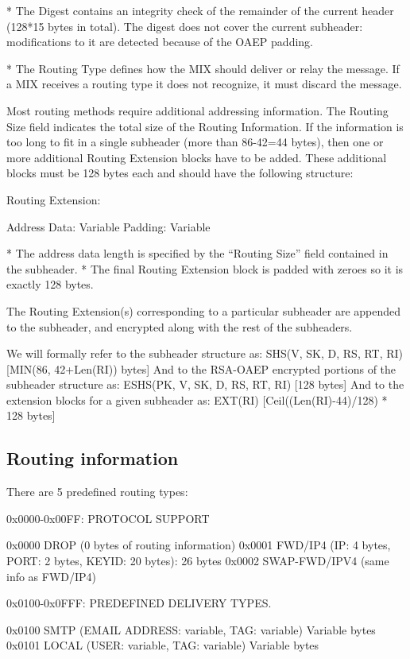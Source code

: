 * The Digest contains an integrity check of the remainder of the current
header (128*15 bytes in total). The digest does not cover the current
subheader: modifications to it are detected because of the OAEP padding.

* The Routing Type defines how the MIX should deliver or relay the
  message. If a MIX receives a routing type it does not recognize,
  it must discard the message.

  Most routing methods require additional addressing information.
  The Routing Size field indicates the total size of the Routing
  Information. If the information is too long to fit in a single
  subheader (more than 86-42=44 bytes), then one or more additional
  Routing Extension blocks have to be added. These additional blocks
  must be 128 bytes each and should have the following structure:
 
  Routing Extension:

    Address Data:     Variable
    Padding:          Variable

* The address data length is specified by the ``Routing Size'' field
  contained in the subheader.
* The final Routing Extension block is padded with zeroes so it is
  exactly 128 bytes.

The Routing Extension(s) corresponding to a particular subheader are
appended to the subheader, and encrypted along with the rest of the
subheaders.

We will formally refer to the subheader structure as:
SHS(V, SK, D, RS, RT, RI)     [MIN(86, 42+Len(RI)) bytes] 
And to the RSA-OAEP encrypted portions of the subheader structure as:
ESHS(PK, V, SK, D, RS, RT, RI)   [128 bytes]
And to the extension blocks for a given subheader as:
EXT(RI)                       [Ceil((Len(RI)-44)/128) * 128 bytes]

\subsection{Routing information}

There are 5 predefined routing types:

0x0000-0x00FF: PROTOCOL SUPPORT

0x0000 DROP    (0 bytes of routing information)
0x0001 FWD/IP4 (IP: 4 bytes, PORT: 2 bytes, KEYID: 20 bytes): 26 bytes
0x0002 SWAP-FWD/IPV4 (same info as FWD/IP4)

0x0100-0x0FFF: PREDEFINED DELIVERY TYPES.

0x0100 SMTP   (EMAIL ADDRESS: variable, TAG: variable) Variable bytes
0x0101 LOCAL  (USER: variable, TAG: variable) Variable bytes

